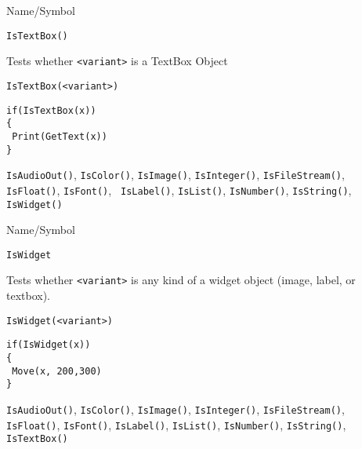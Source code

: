 \rl




\begin{desc}{Name/Symbol}
\item[Name/Symbol]	\verb+IsTextBox()+

\item[Description]	Tests whether \verb+<variant>+ is a TextBox Object

\item[Usage]
\begin{verbatim}
IsTextBox(<variant>)
\end{verbatim}

\item[Example]	
\begin{verbatim}
if(IsTextBox(x))
{
 Print(GetText(x))
}
\end{verbatim}

\item[See Also] \verb+IsAudioOut()+, \verb+IsColor()+,
  \verb+IsImage()+, \verb+IsInteger()+, \verb+IsFileStream()+,
  \verb+IsFloat()+, \verb+IsFont()+, \verb+ IsLabel()+,
  \verb+IsList()+, \verb+IsNumber()+, \verb+IsString()+,
  \verb+IsWidget()+
\end{desc}

\rl

\begin{desc}{Name/Symbol}
\item[Name/Symbol]	\verb+IsWidget+

\item[Description]	Tests whether \verb+<variant>+ is any kind of a widget object
		(image, label, or textbox).

\item[Usage]		
\begin{verbatim}
IsWidget(<variant>)
\end{verbatim}

\item[Example]	
\begin{verbatim}
if(IsWidget(x))
{
 Move(x, 200,300)
}
\end{verbatim}

\item[See Also] \verb+IsAudioOut()+, \verb+IsColor()+,
  \verb+IsImage()+, \verb+IsInteger()+, \verb+IsFileStream()+,
  \verb+IsFloat()+, \verb+IsFont()+, \verb+IsLabel()+,
  \verb+IsList()+, \verb+IsNumber()+, \verb+IsString()+,
  \verb+IsTextBox()+
\end{desc}
\rl

